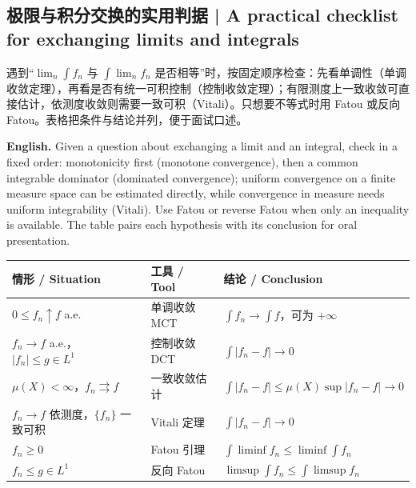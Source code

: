 \documentclass[UTF8,11pt,a4paper]{ctexart}
\newcommand{\EN}[1]{\par\noindent\textbf{English.} #1\par}
\let\APSsubsection\subsection
\renewcommand{\subsection}[1]{\Needspace{6\baselineskip}\APSsubsection{#1}}
\begin{document}
\subsection{极限与积分交换的实用判据 | A practical checklist for exchanging limits and integrals}
\noindent 遇到“$\lim_n\int f_n$ 与 $\int\lim_n f_n$ 是否相等”时，按固定顺序检查：先看单调性（单调收敛定理），再看是否有统一可积控制（控制收敛定理）；有限测度上一致收敛可直接估计，依测度收敛则需要一致可积（Vitali）。只想要不等式时用 Fatou 或反向 Fatou。表格把条件与结论并列，便于面试口述。
\EN{Given a question about exchanging a limit and an integral, check in a fixed order: monotonicity first (monotone convergence), then a common integrable dominator (dominated convergence); uniform convergence on a finite measure space can be estimated directly, while convergence in measure needs uniform integrability (Vitali). Use Fatou or reverse Fatou when only an inequality is available. The table pairs each hypothesis with its conclusion for oral presentation.}
\begin{center}\small
\renewcommand{\arraystretch}{1.15}
\begin{tabular}{@{}p{4.5cm}p{3.7cm}p{7.4cm}@{}}
\hline
情形 / Situation & 工具 / Tool & 结论 / Conclusion\\
\hline
$0\le f_n\uparrow f$ a.e. & 单调收敛 MCT & $\int f_n\to\int f$，可为 $+\infty$\\
$f_n\to f$ a.e.，$|f_n|\le g\in L^1$ & 控制收敛 DCT & $\int|f_n-f|\to0$\\
$\mu(X)<\infty$，$f_n\rightrightarrows f$ & 一致收敛估计 & $\int|f_n-f|\le\mu(X)\sup|f_n-f|\to0$\\
$f_n\to f$ 依测度，$\{f_n\}$ 一致可积 & Vitali 定理 & $\int|f_n-f|\to0$\\
$f_n\ge0$ & Fatou 引理 & $\int\liminf f_n\le\liminf\int f_n$\\
$f_n\le g\in L^1$ & 反向 Fatou & $\limsup\int f_n\le\int\limsup f_n$\\
\hline
\end{tabular}
\end{center}
\end{document}

